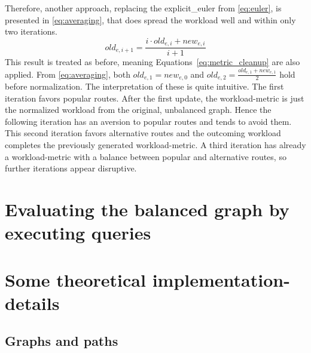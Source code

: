         Therefore, another approach, replacing the \gls{explicit_euler} from \vref{eq:euler}, is presented in \vref{eq:averaging}, that does spread the workload well and within only two iterations.
        \begin{equation}
        \label{eq:averaging}
            \mathit{old}_{e,i+1} = \frac{i \cdot \mathit{old}_{e,i} + \mathit{new}_{e,i}}{i+1}
        \end{equation}
        This result is treated as before, meaning Equations~\ref{eq:metric_cleanup} are also applied.
        From \vref{eq:averaging}, both $\mathit{old}_{e,1}=\mathit{new}_{e,0}$ and $\mathit{old}_{e,2}=\frac{\mathit{old}_{e,1} + \mathit{new}_{e,1}}{2}$ hold before normalization.
        The interpretation of these is quite intuitive.
        The first iteration favors popular routes.
        After the first update, the workload-\gls{metric} is just the normalized workload from the original, unbalanced graph.
        Hence the following iteration has an aversion to popular routes and tends to avoid them.
        This second iteration favors alternative routes and the outcoming workload completes the previously generated workload-\gls{metric}.
        A third iteration has already a workload-\gls{metric} with a balance between popular and alternative routes, so further iterations appear disruptive.

\section{Evaluating the balanced graph by executing queries}



\section{Some theoretical implementation-details}
\label{chap:balancing:implementation}


    \subsection{Graphs and paths}

